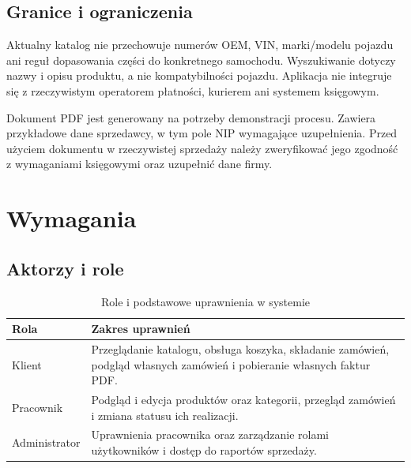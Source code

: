 \documentclass[12pt,a4paper]{article}
\begin{document}
\subsection{Granice i ograniczenia}
Aktualny katalog nie przechowuje numerów OEM, VIN, marki/modelu pojazdu ani
reguł dopasowania części do konkretnego samochodu. Wyszukiwanie dotyczy nazwy
i opisu produktu, a nie kompatybilności pojazdu. Aplikacja nie integruje się
z rzeczywistym operatorem płatności, kurierem ani systemem księgowym.

Dokument PDF jest generowany na potrzeby demonstracji procesu. Zawiera
przykładowe dane sprzedawcy, w tym pole NIP wymagające uzupełnienia. Przed
użyciem dokumentu w rzeczywistej sprzedaży należy zweryfikować jego zgodność
z wymaganiami księgowymi oraz uzupełnić dane firmy.

\section{Wymagania}

\subsection{Aktorzy i role}
\begin{table}[H]
\centering
\small
\begin{tabularx}{\textwidth}{@{}l X@{}}
\toprule
\textbf{Rola} & \textbf{Zakres uprawnień}\\
\midrule
Klient & Przeglądanie katalogu, obsługa koszyka, składanie zamówień,
podgląd własnych zamówień i pobieranie własnych faktur PDF.\\
Pracownik & Podgląd i edycja produktów oraz kategorii, przegląd zamówień
i zmiana statusu ich realizacji.\\
Administrator & Uprawnienia pracownika oraz zarządzanie rolami użytkowników
i dostęp do raportów sprzedaży.\\
\bottomrule
\end{tabularx}
\caption{Role i podstawowe uprawnienia w systemie}
\end{table}
\end{document}
